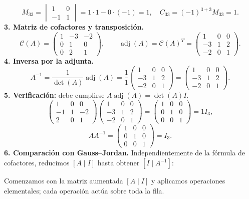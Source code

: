 \documentclass[12pt]{article}
\theoremstyle{remark}
\newcommand{\adj}{\operatorname{adj}}
\begin{document}
\[
M_{33}=\begin{vmatrix}1&0\\-1&1\end{vmatrix}=1\cdot 1-0\cdot (-1)=1,\quad C_{33}=(-1)^{3+3}M_{33}=1.
\]
\textbf{3. Matriz de cofactores y transposición.}
\[
\mathcal{C}(A)=\begin{pmatrix}1&-3&-2\\0&1&0\\0&2&1\end{pmatrix},\qquad\adj(A)=\mathcal{C}(A)^T=\begin{pmatrix}1&0&0\\-3&1&2\\-2&0&1\end{pmatrix}.
\]
\textbf{4. Inversa por la adjunta.}
\[
A^{-1}=\frac1{\det(A)}\adj(A)=\frac1{1}\begin{pmatrix}1&0&0\\-3&1&2\\-2&0&1\end{pmatrix}=\begin{pmatrix}1&0&0\\-3&1&2\\-2&0&1\end{pmatrix}.
\]
\textbf{5. Verificación:} debe cumplirse $A\adj(A)=\det(A)I$.
\[
\begin{pmatrix}1&0&0\\-1&1&-2\\2&0&1\end{pmatrix}\begin{pmatrix}1&0&0\\-3&1&2\\-2&0&1\end{pmatrix}=\begin{pmatrix}1&0&0\\0&1&0\\0&0&1\end{pmatrix}=1I_{3},
\]
\[
AA^{-1}=\begin{pmatrix}1&0&0\\0&1&0\\0&0&1\end{pmatrix}=I_{3}.
\]
\textbf{6. Comparación con Gauss--Jordan.} Independientemente de la fórmula de cofactores, reducimos $[A\mid I]$ hasta obtener $[I\mid A^{-1}]$:

Comenzamos con la matriz aumentada $[A\mid I]$ y aplicamos operaciones elementales; cada operación actúa sobre toda la fila.
\end{document}

